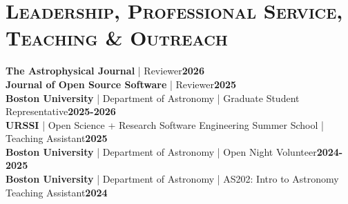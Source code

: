 \documentclass[11pt]{article}
\begin{document}
\section{\textsc{Leadership, Professional Service, Teaching \& Outreach}}
\textbf{The Astrophysical Journal} | Reviewer\hfill\textbf{2026} \\
\textbf{Journal of Open Source Software} | Reviewer\hfill\textbf{2025} \\
\textbf{Boston University} | Department of Astronomy | Graduate Student Representative\hfill\textbf{2025-2026} \\
\textbf{URSSI} | Open Science + Research Software Engineering Summer School | Teaching Assistant\hfill\textbf{2025} \\
\textbf{Boston University} | Department of Astronomy | Open Night Volunteer\hfill\textbf{2024-2025} \\
\textbf{Boston University} | Department of Astronomy | AS202: Intro to Astronomy Teaching Assistant\hfill\textbf{2024}
\end{document}
